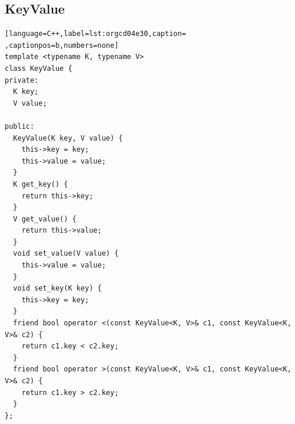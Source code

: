 \documentclass[a4paper,12pt]{article}
\begin{document}
\subsection{KeyValue}
\label{sec:org957000b}
\begin{lstlisting}[language=C++,label=lst:orgcd04e30,caption= ,captionpos=b,numbers=none]
template <typename K, typename V>
class KeyValue {
private:
  K key;
  V value;

public:
  KeyValue(K key, V value) {
    this->key = key;
    this->value = value;
  }
  K get_key() {
    return this->key;
  }
  V get_value() {
    return this->value;
  }
  void set_value(V value) {
    this->value = value;
  }
  void set_key(K key) {
    this->key = key;
  }
  friend bool operator <(const KeyValue<K, V>& c1, const KeyValue<K, V>& c2) {
    return c1.key < c2.key;
  }
  friend bool operator >(const KeyValue<K, V>& c1, const KeyValue<K, V>& c2) {
    return c1.key > c2.key;
  }
};
\end{lstlisting}
\end{document}
